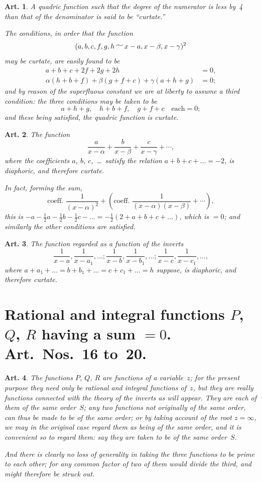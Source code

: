 \documentclass[11pt,a4paper]{article}
\theoremstyle{plain}
\newtheorem{art}{Art.}[section]
\begin{document}
\begin{art}
A quadric function such that the degree of the numerator is less by~4
than that of the denominator is said to be ``curtate.''

The conditions, in order that the function
\[
(a, b, c, f, g, h \,\raisebox{-.5ex}{$\widetilde{\phantom{aa}}$}\, x-a, x-\beta, x-\gamma)^2
\]
may be curtate, are easily found to be
\begin{align*}
a + b + c + 2f + 2g + 2h &= 0, \\
\alpha(h + b + f) + \beta(g + f + c) + \gamma(a + h + g) &= 0;
\end{align*}
and by reason of the superfluous constant we are at liberty to assume a
third condition: the three conditions may be taken to be
\[
a + h + g, \quad h + b + f, \quad g + f + c \quad \text{each} = 0;
\]
and these being satisfied, the quadric function is curtate.
\end{art}

\begin{art}
The function
\[
\frac{a}{x-\alpha} + \frac{b}{x-\beta} + \frac{c}{x-\gamma} + \cdots,
\]
where the coefficients $a$, $b$, $c$,~\ldots\ satisfy the relation
$a + b + c + \ldots = -2$, is diaphoric, and therefore curtate.

In fact, forming the sum,
\[
\text{coeff.\ } \frac{1}{(x-\alpha)^2}
+ (\text{coeff.\ } \frac{1}{(x-\alpha)(x-\beta)} + \cdots),
\]
this is $-a - \frac{1}{2}a - \frac{1}{2}b - \frac{1}{2}c - \ldots = -\frac{1}{2}(2 + a + b + c + \ldots)$,
which is $=0$; and similarly the other conditions are satisfied.
\end{art}

\begin{art}
The function regarded as a function of the inverts
\[
\frac{1}{x-a}, \frac{1}{x-a_1}, \ldots; \frac{1}{x-b}, \frac{1}{x-b_1}, \ldots; \frac{1}{x-c}, \frac{1}{x-c_1}, \ldots,
\]
where $a + a_1 + \ldots = b + b_1 + \ldots = c + c_1 + \ldots = h$ suppose,
is diaphoric, and therefore curtate.
\end{art}


\section*{Rational and integral functions $P$, $Q$, $R$ having a sum $=0$.
Art.~Nos.~16 to~20.}

\begin{art}
The functions $P$, $Q$, $R$ are functions of a variable~$z$; for the present
purpose they need only be rational and integral functions of~$z$, but they
are really functions connected with the theory of the inverts as will
appear. They are each of them of the same order~$S$; any two functions
not originally of the same order, can thus be made to be of the same
order; or by taking account of the root $z = \infty$, we may in the original
case regard them as being of the same order, and it is convenient so to
regard them: say they are taken to be of the same order~$S$.

And there is clearly no loss of generality in taking the three functions
to be prime to each other; for any common factor of two of them would
divide the third, and might therefore be struck out.
\end{art}
\end{document}
